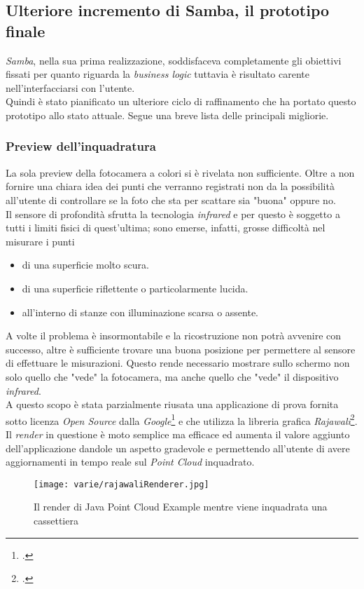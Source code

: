 \subsection{Ulteriore incremento di Samba, il prototipo finale}
\emph{Samba}, nella sua prima realizzazione, soddisfaceva completamente gli obiettivi fissati per quanto riguarda la \emph{business logic} tuttavia è risultato carente nell'interfacciarsi con l'utente.\\
Quindi è stato pianificato un ulteriore ciclo di raffinamento che ha portato questo prototipo allo stato attuale. Segue una breve lista delle principali migliorie.

\subsubsection{Preview dell'inquadratura}
\label{cap:frame_preview}
La sola preview della fotocamera a colori si è rivelata non sufficiente. Oltre a non fornire una chiara idea dei punti che verranno registrati non da la possibilità all'utente di controllare se la foto che sta per scattare sia "buona" oppure no.\\
Il sensore di profondità sfrutta la tecnologia \emph{infrared} e per questo è soggetto a tutti i limiti fisici di quest'ultima; sono emerse, infatti, grosse difficoltà nel misurare i punti
\begin{itemize}
	\item di una superficie molto scura.
	\item di una superficie riflettente o particolarmente lucida.
	\item all'interno di stanze con illuminazione scarsa o assente.
\end{itemize}
A volte il problema è insormontabile e la ricostruzione non potrà avvenire con successo, altre è sufficiente trovare una buona posizione per permettere al sensore di effettuare le misurazioni. Questo rende necessario mostrare sullo schermo non solo quello che "vede" la fotocamera, ma anche quello che "vede" il dispositivo \emph{infrared}.\\
A questo scopo è stata parzialmente riusata una applicazione di prova fornita sotto licenza \emph{Open Source} dalla \emph{Google}\footcite{GitHub: https://github.com/googlesamples/tango-examples-java} e che utilizza la libreria grafica \emph{Rajawali}\footcite{GitHub: https://github.com/Rajawali/Rajawali}.\\
Il \emph{render} in questione è moto semplice ma efficace ed aumenta il valore aggiunto dell'applicazione dandole un aspetto gradevole e permettendo all'utente di avere aggiornamenti in tempo reale sul \emph{Point Cloud} inquadrato.
\begin{figure}[!h] 
    \centering 
    \texttt{[image: varie/rajawaliRenderer.jpg]} 
    \caption{Il render di Java Point Cloud Example mentre viene inquadrata una cassettiera}
\end{figure}


